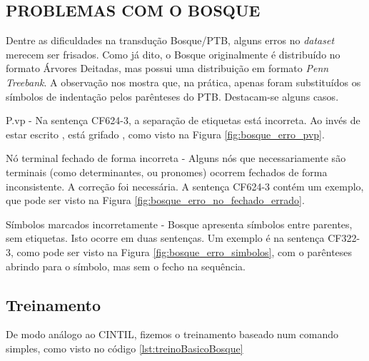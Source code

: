 \subsection{PROBLEMAS COM O BOSQUE}
\label{subsec:erros_bosque}
Dentre as dificuldades na transdução Bosque/PTB, alguns erros no \textit{dataset} merecem ser frisados. Como já dito, o Bosque originalmente é distribuído no formato Árvores Deitadas, mas possui uma distribuição em formato \textit{Penn Treebank}. A observação nos mostra que, na prática, apenas foram substituídos os símbolos de indentação pelos parênteses do PTB. 
Destacam-se alguns casos.

P.vp - Na sentença CF624-3, a separação de etiquetas está incorreta. Ao invés de estar escrito , está grifado , como visto na Figura \ref{fig:bosque_erro_pvp}.

\begin{center}
    
\end{center}

Nó terminal fechado de forma incorreta - Alguns nós que necessariamente são terminais (como determinantes, ou pronomes) ocorrem fechados de forma inconsistente. A correção foi necessária. A sentença CF624-3 contém um exemplo, que pode ser visto na Figura \ref{fig:bosque_erro_no_fechado_errado}.

\begin{center}
    
\end{center}

Símbolos marcados incorretamente - Bosque apresenta símbolos entre parentes, sem etiquetas. Isto ocorre em duas sentenças. Um exemplo é na sentença CF322-3, como pode ser visto na Figura \ref{fig:bosque_erro_simbolos}, com o parênteses abrindo para o símbolo, mas sem o fecho na sequência. 

\begin{center}
    
\end{center}

\subsection{Treinamento}
\label{subsec:treinamento_bosque}
De modo análogo ao CINTIL, fizemos o treinamento baseado num comando simples, como visto no código \ref{lst:treinoBasicoBosque}
\begin{center}
    
\end{center}

